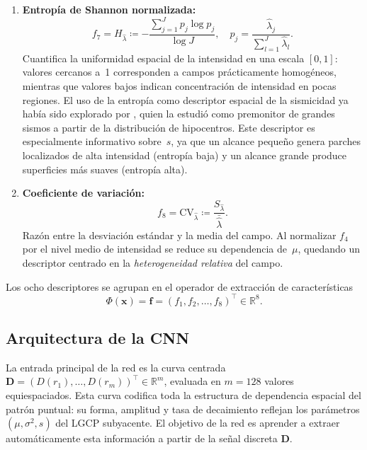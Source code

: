 \documentclass[a4paper,fleqn]{cas-sc}
\numberwithin{equation}{section}
\begin{document}
\begin{enumerate}[label=(\roman*),leftmargin=*,itemsep=0.6em]
\item \textbf{Entrop\'ia de Shannon normalizada:}
\begin{equation}
f_7 = H_{\hat{\lambda}} \coloneqq
    -\frac{\sum_{j=1}^{J} p_j\log p_j}{\log J}, \quad
    p_j = \frac{\hat{\lambda}_j}{\sum_{l=1}^{J}\hat{\lambda}_l}.
\label{eq:f7_entropy}
\end{equation}
Cuantifica la uniformidad espacial de la intensidad en una escala $[0,1]$:
valores cercanos a~1 corresponden a campos pr\'acticamente homog\'eneos,
mientras que valores bajos indican concentraci\'on de intensidad en pocas
regiones. El uso de la entrop\'ia como descriptor espacial de la
sismicidad ya hab\'ia sido explorado por \citet{Despaigne2017}, quien la
estudi\'o como premonitor de grandes sismos a partir de la distribuci\'on
de hipocentros. Este descriptor es especialmente informativo
sobre~$s$, ya que un alcance peque\~no genera parches localizados de alta
intensidad (entrop\'ia baja) y un alcance grande produce superficies
m\'as suaves (entrop\'ia alta).

\item \textbf{Coeficiente de variaci\'on:}
\begin{equation}
f_8 = \mathrm{CV}_{\hat{\lambda}} \coloneqq
    \frac{S_{\hat{\lambda}}}{\bar{\hat{\lambda}}}.
\label{eq:f8_cv}
\end{equation}
Raz\'on entre la desviaci\'on est\'andar y la media del campo. Al normalizar $f_4$ por el nivel medio de intensidad se reduce su dependencia de~$\mu$, quedando un descriptor centrado en la \emph{heterogeneidad relativa} del campo.
\end{enumerate}

Los ocho descriptores se agrupan en el operador de extracci\'on de
caracter\'isticas
\begin{equation}
    \Phi(\mathbf{x}) = \mathbf{f} =
    (f_1,f_2,\ldots,f_{8})^{\top} \in \mathbb{R}^{8}.
    \label{eq:phi}
\end{equation}

\subsection{Arquitectura de la CNN}
\label{sec:cnn_extended}

La entrada principal de la red es la curva centrada
$\mathbf{D}=(D(r_1),\ldots,D(r_m))^{\top}\in\mathbb{R}^{m}$, evaluada en
$m=128$ valores equiespaciados. Esta curva codifica toda la estructura de
dependencia espacial del patr\'on puntual: su forma, amplitud y tasa de
decaimiento reflejan los par\'ametros $(\mu,\sigma^2,s)$ del LGCP
subyacente. El objetivo de la red es aprender a extraer autom\'aticamente
esta informaci\'on a partir de la se\~nal discreta $\mathbf{D}$.
\end{document}
